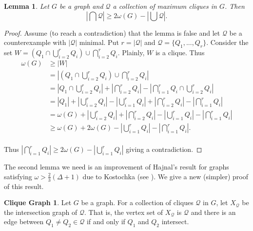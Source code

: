 \documentclass[12pt]{article}
\theoremstyle{plain}
\newtheorem{lem}[thm]{Lemma}
\theoremstyle{definition}
\newtheorem*{CliqueGraph}{Clique Graph}
\theoremstyle{remark}
\begin{document}
\begin{lem}\label{HajnalLemma}
Let $G$ be a graph and $\mathcal{Q}$ a collection of maximum cliques in $G$. Then
\[\left | \bigcap \mathcal{Q}\right | \geq 2\omega(G) - \left | \bigcup \mathcal{Q}\right |.\]
\end{lem}
\begin{proof}
Assume (to reach a contradiction) that the lemma is false and let $\mathcal{Q}$ be a counterexample with $|\mathcal{Q}|$ minimal.  Put $r = |\mathcal{Q}|$ and $\mathcal{Q} = \{Q_1, ..., Q_r\}$.  Consider the set $\displaystyle W = (Q_1 \cap \bigcup_{i=2}^r Q_i) \cup \bigcap_{i=2}^r Q_i$.  Plainly, $W$ is a clique.  Thus
\begin{align*}
\omega(G) &\geq |W| \\
&= \left |(Q_1 \cap \bigcup_{i=2}^r Q_i) \cup \bigcap_{i=2}^r Q_i \right | \\
&= \left |Q_1 \cap \bigcup_{i=2}^r Q_i \right | + \left |\bigcap_{i=2}^r Q_i \right | - \left |\bigcap_{i=1}^r Q_i \cap \bigcup_{i=2}^r Q_i \right | \\
&= \left |Q_1 \right | + \left |\bigcup_{i=2}^r Q_i \right | - \left |\bigcup_{i=1}^r Q_i \right| + \left |\bigcap_{i=2}^r Q_i \right | - \left |\bigcap_{i=1}^r Q_i \right | \\
&= \omega(G) + \left |\bigcup_{i=2}^r Q_i \right | + \left |\bigcap_{i=2}^r Q_i \right | - \left |\bigcup_{i=1}^r Q_i \right| - \left |\bigcap_{i=1}^r Q_i \right | \\
&\geq \omega(G) + 2\omega(G) - \left |\bigcup_{i=1}^r Q_i \right| - \left |\bigcap_{i=1}^r Q_i \right |. \\
\end{align*}

Thus $\displaystyle \left |\bigcap_{i=1}^r Q_i \right | \geq 2\omega(G) - \left |\bigcup_{i=1}^r Q_i \right|$ giving a contradiction.
\end{proof}

The second lemma we need is an improvement of Hajnal's result for graphs satisfying $\omega > \frac{2}{3}(\Delta + 1)$ due to Kostochka (see \cite{Kostochka}).  We give a new (simpler) proof of this result.

\begin{CliqueGraph}
Let $G$ be a graph. For a collection of cliques $\mathcal{Q}$ in $G$, let $X_{\mathcal{Q}}$ be the intersection graph of $\mathcal{Q}$.  That is, the vertex set of $X_{\mathcal{Q}}$ is $\mathcal{Q}$ and there is an edge between $Q_1 \neq Q_2 \in \mathcal{Q}$ if and only if $Q_1$ and $Q_2$ intersect.
\end{CliqueGraph}
\end{document}
